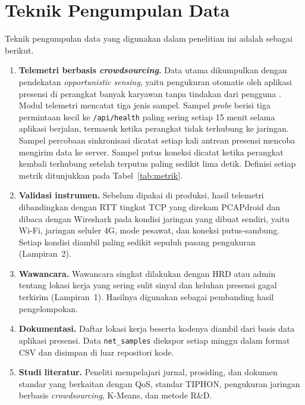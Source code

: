 \section{Teknik Pengumpulan Data}
\label{sec:pengumpulan}
Teknik pengumpulan data yang digunakan dalam penelitian ini adalah sebagai berikut.
\begin{enumerate}
    \item \textbf{Telemetri berbasis \textit{crowdsourcing}.} Data utama dikumpulkan dengan pendekatan \textit{opportunistic sensing}, yaitu pengukuran otomatis oleh aplikasi presensi di perangkat banyak karyawan tanpa tindakan dari pengguna \parencite{wu2017mopeye,wamser2021crowd}. Modul telemetri mencatat tiga jenis sampel. Sampel \textit{probe} berisi tiga permintaan kecil ke \texttt{/api/health} paling sering setiap 15 menit selama aplikasi berjalan, termasuk ketika perangkat tidak terhubung ke jaringan. Sampel percobaan sinkronisasi dicatat setiap kali antrean presensi mencoba mengirim data ke server. Sampel putus koneksi dicatat ketika perangkat kembali terhubung setelah terputus paling sedikit lima detik. Definisi setiap metrik ditunjukkan pada Tabel~\ref{tab:metrik}.
    \item \textbf{Validasi instrumen.} Sebelum dipakai di produksi, hasil telemetri dibandingkan dengan RTT tingkat TCP yang direkam PCAPdroid dan dibaca dengan Wireshark pada kondisi jaringan yang dibuat sendiri, yaitu Wi-Fi, jaringan seluler 4G, mode pesawat, dan koneksi putus-sambung. Setiap kondisi diambil paling sedikit sepuluh pasang pengukuran (Lampiran~2).
    \item \textbf{Wawancara.} Wawancara singkat dilakukan dengan HRD atau admin tentang lokasi kerja yang sering sulit sinyal dan keluhan presensi gagal terkirim (Lampiran~1). Hasilnya digunakan sebagai pembanding hasil pengelompokan.
    \item \textbf{Dokumentasi.} Daftar lokasi kerja beserta kodenya diambil dari basis data aplikasi presensi. Data \texttt{net\_samples} diekspor setiap minggu dalam format CSV dan disimpan di luar repositori kode.
    \item \textbf{Studi literatur.} Peneliti mempelajari jurnal, prosiding, dan dokumen standar yang berkaitan dengan QoS, standar TIPHON, pengukuran jaringan berbasis \textit{crowdsourcing}, K-Means, dan metode R\&D.
\end{enumerate}

